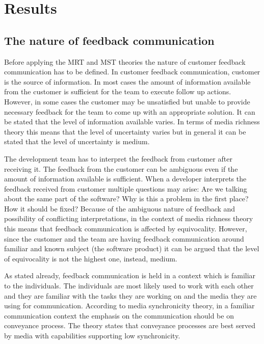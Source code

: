 \documentclass[conference]{IEEEtran}
\begin{document}
\section{Results}

\subsection{The nature of feedback communication}

Before applying the MRT and MST theories the nature of customer feedback communication has to be defined. In customer feedback communication, customer is the source of information. In most cases the amount of information available from the customer is sufficient for the team to execute follow up actions. However, in some cases the customer may be unsatisfied but unable to provide necessary feedback for the team to come up with an appropriate solution. It can be stated that the level of information available varies. In terms of media richness theory this means that the level of uncertainty varies but in general it can be stated that the level of uncertainty is medium. 

The development team has to interpret the feedback from customer after receiving it. The feedback from the customer can be ambiguous even if the amount of information available is sufficient. When a developer interprets the feedback received from customer multiple questions may arise: Are we talking about the same part of the software? Why is this a problem in the first place? How it should be fixed? Because of the ambiguous nature of feedback and possibility of conflicting interpretations, in the context of media richness theory this means that feedback communication is affected by equivocality. However, since the customer and the team are having feedback communication around familiar and known subject (the software product) it can be argued that the level of equivocality is not the highest one, instead, medium.

As stated already, feedback communication is held in a context which is familiar to the individuals. The individuals are most likely used to work with each other and they are familiar with the tasks they are working on and the media they are using for communication. According to media synchronicity theory, in a familiar communication context the emphasis on the communication should be on conveyance process. The theory states that conveyance processes are best served by media with capabilities supporting low synchronicity.
\end{document}
